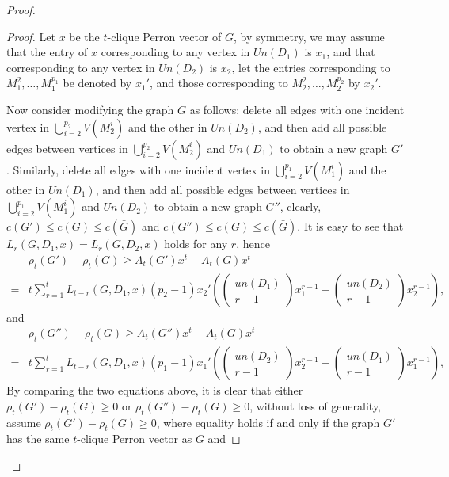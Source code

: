 \documentclass[10pt,a4paper]{amsart}
\begin{document}
\begin{proof}
\begin{proof}
                Let $x$ be the $t$-clique Perron vector of $G$, by symmetry, we may assume that the entry of $x$ corresponding to any vertex in $Un(D_1)$ is $x_1$, and that corresponding to any vertex in $Un(D_2)$ is $x_2$, let the entries corresponding to $M_1^2, \ldots, M_1^{p_1}$ be denoted by $x_1'$, and those corresponding to $M_2^2, \ldots, M_2^{p_2}$ by $x_2'$.

                Now consider modifying the graph $G$ as follows: delete all edges with one incident vertex in $\bigcup_{i=2}^{p_2} V(M_2^i)$ and the other in $Un(D_2)$, and then add all possible edges between vertices in $\bigcup_{i=2}^{p_2} V(M_2^i)$ and $Un(D_1)$ to obtain a new graph $G'$. Similarly, delete all edges with one incident vertex in $\bigcup_{i=2}^{p_1} V(M_1^i)$ and the other in $Un(D_1)$, and then add all possible edges between vertices in $\bigcup_{i=2}^{p_1} V(M_1^i)$ and $Un(D_2)$ to obtain a new graph $G''$, clearly, $c(G') \leq c(G) \leq c(\bar{G})$ and $c(G'') \leq c(G) \leq c(\bar{G})$. It is easy to see that $L_r(G, D_1, x) = L_r(G, D_2, x)$ holds for any $r$, hence
                    \begin{align*}
                        &\rho_t(G')-\rho_t(G)
                        \geq  A_t(G')x^t-A_t(G)x^t
                        \\= & t\sum_{r=1}^{t}L_{t-r}(G, D_1, x) (p_2-1)x_2' \left( \begin{pmatrix}un(D_1)\\r-1\end{pmatrix}x_1^{r-1}-\begin{pmatrix}un(D_2)\\r-1\end{pmatrix}x_2^{r-1} \right),
                    \end{align*}
                and
                    \begin{align*}
                        &\rho_t(G'')-\rho_t(G)
                        \geq  A_t(G'')x^t-A_t(G)x^t
                        \\= & t\sum_{r=1}^{t}L_{t-r}(G, D_1, x) (p_1-1)x_1' \left( \begin{pmatrix}un(D_2)\\r-1\end{pmatrix}x_2^{r-1}-\begin{pmatrix}un(D_1)\\r-1\end{pmatrix}x_1^{r-1} \right),
                    \end{align*}
                By comparing the two equations above, it is clear that either $\rho_t(G')-\rho_t(G)\geq 0$ or $\rho_t(G'')-\rho_t(G)\geq 0$, without loss of generality, assume $\rho_t(G')-\rho_t(G)\geq 0$, where equality holds if and only if the graph $G'$ has the same $t$-clique Perron vector as $G$ and

\end{proof}
\end{proof}
\end{document}
